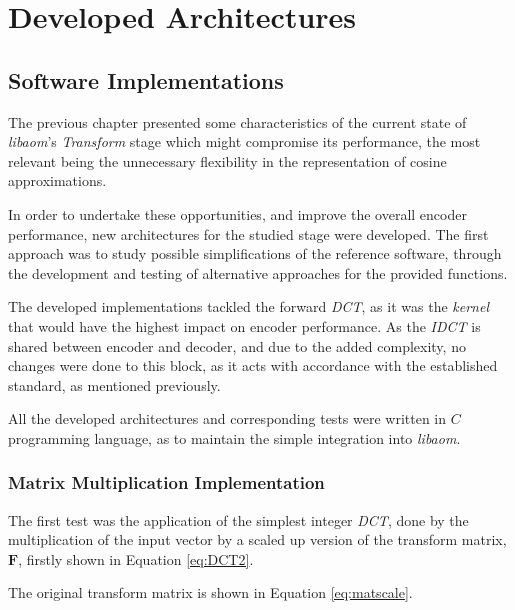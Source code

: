 \cleardoublepage
\chapter{Developed Architectures}

\section{Software Implementations}

The previous chapter presented some characteristics of the current state of \emph{libaom}'s \emph{Transform} stage which might compromise its performance, the most relevant being the unnecessary flexibility in the representation of cosine approximations.

In order to undertake these opportunities, and improve the overall encoder performance, new architectures for the studied stage were developed. The first approach was to study possible simplifications of the reference software, through the development and testing of alternative approaches for the provided functions.

The developed implementations tackled the forward \emph{DCT}, as it was the \emph{kernel} that would have the highest impact on encoder performance. As the \emph{IDCT} is shared between encoder and decoder, and due to the added complexity, no changes were done to this block, as it acts with accordance with the established standard, as mentioned previously. 

All the developed architectures and corresponding tests were written in $C$ programming language, as to maintain the simple integration into \emph{libaom}.

\subsection{Matrix Multiplication Implementation}

The first test was the application of the simplest integer \emph{DCT}, done by the multiplication of the input vector by a scaled up version of the transform matrix, $\mathbf{F}$, firstly shown in Equation \ref{eq:DCT2}. 

The original transform matrix is shown in Equation \ref{eq:matscale}.

